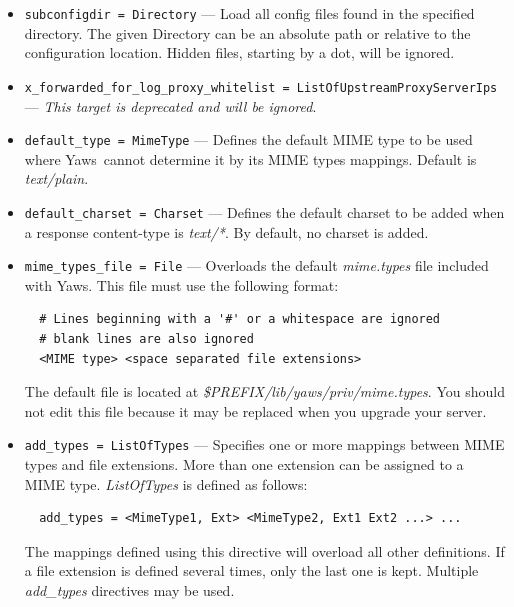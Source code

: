 \documentclass[11pt,oneside,english]{book}
\newcommand{\Yaws}            %
        {{\sc Yaws}}
\begin{document}
\begin{itemize}
               Or, relatively to the configuration location:

\begin{verbatim}
  subconfig = global.conf
  subconfig = vhosts/*.conf
\end{verbatim}

\item        \verb+subconfigdir = Directory+ ---
              Load all config files found in the specified directory. The given
              Directory can be an absolute path or relative to the configuration
              location. Hidden files, starting by a dot, will be ignored.

\item        \verb+x_forwarded_for_log_proxy_whitelist = ListOfUpstreamProxyServerIps+ ---
              \textit{This target is deprecated and will be ignored}.

\item        \verb+default_type = MimeType+ ---
              Defines the default MIME type to be used where \Yaws\ cannot
              determine it by its MIME types mappings. Default is
              \textit{text/plain}.

\item        \verb+default_charset = Charset+ ---
              Defines the default charset to be added when a response
              content-type is \textit{text/*}. By default, no charset is added.

\item        \verb+mime_types_file = File+ ---
              Overloads the default \textit{mime.types} file included with
              \Yaws{}. This file must use the following format:
\begin{verbatim}
  # Lines beginning with a '#' or a whitespace are ignored
  # blank lines are also ignored
  <MIME type> <space separated file extensions>
\end{verbatim}
              The default file is located at
              \textit{\${PREFIX}/lib/yaws/priv/mime.types}. You should not edit
              this file because it may be replaced when you upgrade your server.

\item        \verb+add_types = ListOfTypes+ ---
              Specifies one or more mappings between MIME types and file
              extensions. More than one extension can be assigned to a MIME
              type. \textit{ListOfTypes} is defined as follows:
\begin{verbatim}
  add_types = <MimeType1, Ext> <MimeType2, Ext1 Ext2 ...> ...
\end{verbatim}
              The mappings defined using this directive will overload all other
              definitions. If a file extension is defined several times, only
              the last one is kept. Multiple \textit{add\_types} directives may
              be used.


\end{itemize}
\end{document}
